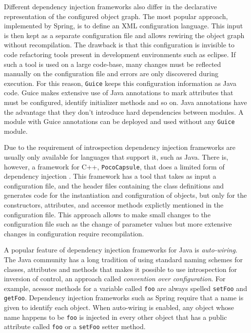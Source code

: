 Different dependency injection frameworks also differ in the declarative representation of the configured object graph.
The most popular approach, implemented by Spring, is to define an XML configuration language. This input is then
kept as a separate configuration file and allows rewiring the object graph without recompilation. The drawback
is that this configuration is invisible to code refactoring \cite{Fowler3} tools present in development environments such as eclipse.
If such a tool is used on a large code-base, many changes must be reflected manually on the configuration file and
errors are only discovered during execution. For this reason, \texttt{Guice} keeps this configuration information as Java code.
Guice makes extensive use of Java annotations to mark attributes that must be configured, identify initializer methods
and so on. Java annotations have the advantage that they don't introduce hard dependencies between modules.
A module with Guice annotations can be deployed and used without any \texttt{Guice} module.

Due to the requirement of introspection dependency injection frameworks are usually only available for languages
that support it, such as Java. There is, however, a framework for C++, \texttt{PocoCapsule}, that does a limited form of
dependency injection \cite{PocoCapsule}. This framework has a tool that takes as input a configuration file, and
the header files containing the class definitions and generates code for the instantiation and configuration
of objects, but only for the constructors, attributes, and accessor methods explictly mentioned in the configuration
file. This approach allows to make small changes to the configuration file such as the change of parameter values
but more extensive changes in configuration require recompilation.

A popular feature of dependency injection frameworks for Java is \emph{auto-wiring}. The Java community has a
long tradition of using standard naming schemes for classes, attributes and methods that makes it possible to
use introspection for inversion of control, an approach called \emph{convention over configuration}. For example,
acessor methods for a variable called \texttt{foo} are always spelled \texttt{setFoo} and \texttt{getFoo}.
Dependency injection frameworks such as Spring require that a name is given to identify each object. When
auto-wiring is enabled, any object whose name happens to be \texttt{foo} is injected in every other object
that has a public attribute called \texttt{foo} or a \texttt{setFoo} setter method.

